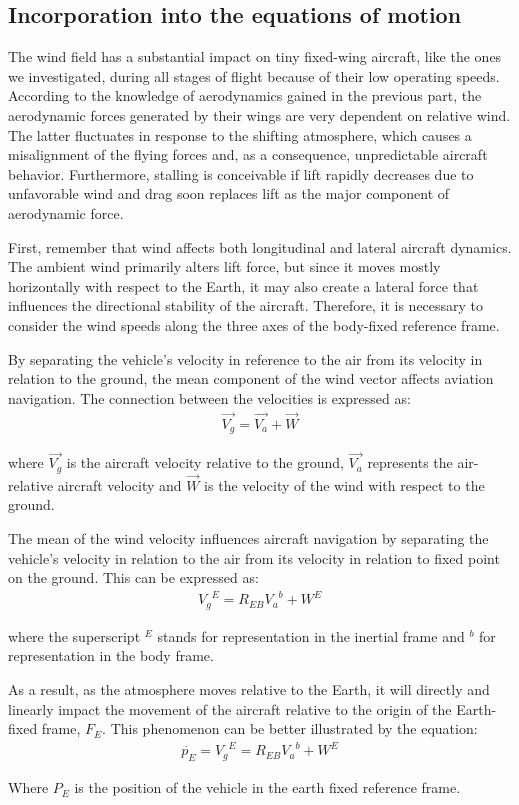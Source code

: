 \documentclass[conference]{IEEEtran}
\begin{document}
\subsection{Incorporation into the equations of motion}
\par
The wind field has a substantial impact on tiny fixed-wing aircraft, like the
ones we investigated, during all stages of flight because of their low operating
speeds. According to the knowledge of aerodynamics gained in the previous part,
the aerodynamic forces generated by their wings are very dependent on relative
wind. The latter fluctuates in response to the shifting atmosphere, which
causes a misalignment of the flying forces and, as a consequence, unpredictable
aircraft behavior. Furthermore, stalling is conceivable if lift rapidly
decreases due to unfavorable wind and drag soon replaces lift as the major
component of aerodynamic force.
\par
First, remember that wind affects both longitudinal and lateral aircraft
dynamics. The ambient wind primarily alters lift force, but since it moves
mostly horizontally with respect to the Earth, it may also create a lateral
force that influences the directional stability of the aircraft. Therefore, it
is necessary to consider the wind speeds along the three axes of the body-fixed
reference frame.
\par
By separating the vehicle's velocity in reference to the air from its velocity
in relation to the ground, the mean component of the wind vector affects
aviation navigation. The connection between the velocities is expressed as:
\begin{align}
    \vec{V_g}=\vec{V_a}+\vec{W}
\end{align}
\par
where $\vec{V_g}$ is the aircraft velocity relative to the ground, $\vec{V_a}$ represents
the air-relative aircraft velocity and $\vec{W}$ is the velocity of the wind with
respect to the ground.
\par
The mean of the wind velocity influences aircraft navigation by separating the
vehicle's velocity in relation to the air from its velocity in relation to
fixed point on the ground. This can be expressed as:
\begin{align}
    {V_g}^E=R_{EB}{V_a}^b+W^E
    \label{AircraftVelocityRelativeToGroundInThePresenceOfWind}
\end{align}
\par
where the superscript $^E$ stands for representation in the inertial frame and $^b$ for
representation in the body frame.
\par
As a result, as the atmosphere moves relative to the Earth, it will directly
and linearly impact the movement of the aircraft relative to the origin of the
Earth-fixed frame, $F_E$. This phenomenon can be better illustrated by the
equation:
\begin{align}
    \dot{p_E}={V_g}^E={R_{EB}}{V_a}^b+W^E
    \label{AircraftPositionDerivativeRelativeToGroundInThePresenceOfWind}
\end{align}
\par
Where $P_E$ is the position of the vehicle in the earth fixed reference frame.
\end{document}

